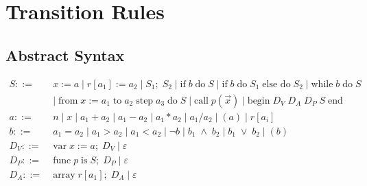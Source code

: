 


\chapter{Transition Rules}
\label{app:TransitionRules}

\section{Abstract Syntax}
\begin{align*}
S::= \; & x := a \; | \; r[a_1] := a_2 \; | \; S_1; \; S_2 \; | \; \text{if} \; b \; \text{do} \; S \; | \; \text{if} \; b \; \text{do} \; S_1 \; \text{else do} \; S_2 \; | \; \text{while} \; b \; \text{do} \; S \\
~ & | \; \text{from} \; x := a_1 \; \text{to} \; a_2 \; \text{step} \; a_3 \; \text{do} \; S \; | \; \text{call} \; p(\vec{x}) \; | \; \text{begin} \; D_V \; D_A \; D_P \; S \; \text{end} \\
a::= \; & n \; | \; x \; | \; a_1 + a_2 \; | \; a_1 - a_2 \; | \; a_1 * a_2 \; | \; a_1 / a_2 \; | \; (a) \; | \; r[a_i]\\
b::= \; &a_1 = a_2 \; | \; a_1 > a_2 \; | \; a_1 < a_2 \; | \; \neg b \; | \; b_1 \; \wedge \; b_2 \; | \; b_1 \; \vee \; b_2 \; | \; (b) \\
D_V::= \; & \text{var} \; x := a; \; D_V \; | \; \varepsilon \\
D_P::= \; & \text{func} \; p \; \text{is} \; S;\;  D_P \; | \; \varepsilon \\
D_A::= \; & \text{array} \; r[a_1]; \; D_A \; | \; \varepsilon \\
\end{align*}


